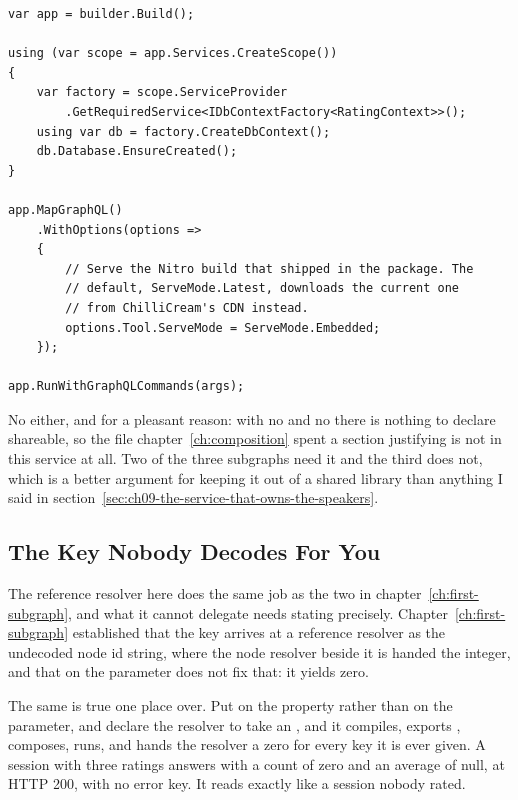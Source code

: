 \begin{verbatim}
var app = builder.Build();

using (var scope = app.Services.CreateScope())
{
    var factory = scope.ServiceProvider
        .GetRequiredService<IDbContextFactory<RatingContext>>();
    using var db = factory.CreateDbContext();
    db.Database.EnsureCreated();
}

app.MapGraphQL()
    .WithOptions(options =>
    {
        // Serve the Nitro build that shipped in the package. The
        // default, ServeMode.Latest, downloads the current one
        // from ChilliCream's CDN instead.
        options.Tool.ServeMode = ServeMode.Embedded;
    });

app.RunWithGraphQLCommands(args);
\end{verbatim}

%
No  either, and for a pleasant reason: with no
 and no  there is nothing to declare shareable, so the
file chapter~\ref{ch:composition} spent a section justifying is not in this
service at all. Two of the three subgraphs need it and the third does not,
which is a better argument for keeping it out of a shared library than
anything I said in section~\ref{sec:ch09-the-service-that-owns-the-speakers}.

\subsection{The Key Nobody Decodes For You}

%
The reference resolver here does the same job as the two in
chapter~\ref{ch:first-subgraph}, and what it cannot delegate needs stating
precisely. Chapter~\ref{ch:first-subgraph} established that the key
arrives at a reference resolver as the undecoded node id string, where the node
resolver beside it is handed the integer, and that \code{[ID<T>]} on the
parameter does not fix that: it yields zero.

%
The same is true one place over. Put \code{[ID<Session>]} on the property
rather than on the parameter, and declare the resolver to take an ,
and it compiles, exports , composes, runs, and hands the resolver
a zero for every key it is ever given. A session with three ratings answers
with a count of zero and an average of null, at HTTP 200, with no error key.
It reads exactly like a session nobody rated.

